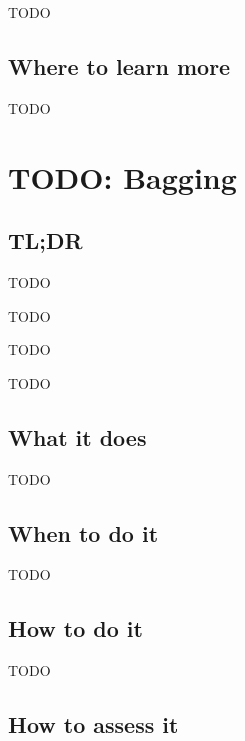 \documentclass[
]{book}
\providecommand{\tightlist}{%
  \setlength{\itemsep}{0pt}\setlength{\parskip}{0pt}}
\begin{document}
TODO

\hypertarget{where-to-learn-more-14}{%
\section{Where to learn more}\label{where-to-learn-more-14}}

TODO

\hypertarget{bagging}{%
\chapter{TODO: Bagging}\label{bagging}}

\hypertarget{tldr-15}{%
\section{TL;DR}\label{tldr-15}}

\begin{description}
\tightlist
\item[What it does]
TODO
\item[When to do it]
TODO
\item[How to do it]
TODO
\item[How to assess it]
TODO
\end{description}

\hypertarget{what-it-does-15}{%
\section{What it does}\label{what-it-does-15}}

TODO

\hypertarget{when-to-do-it-15}{%
\section{When to do it}\label{when-to-do-it-15}}

TODO

\hypertarget{how-to-do-it-15}{%
\section{How to do it}\label{how-to-do-it-15}}

TODO

\hypertarget{how-to-assess-it-15}{%
\section{How to assess it}\label{how-to-assess-it-15}}
\end{document}
